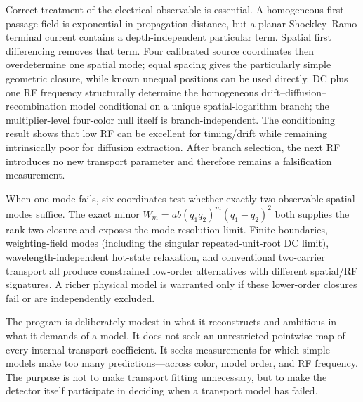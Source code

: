 \documentclass[11pt]{article}
\begin{document}
Correct treatment of the electrical observable is essential. A homogeneous first-passage field is exponential in propagation distance, but a planar Shockley--Ramo terminal current contains a depth-independent particular term. Spatial first differencing removes that term. Four calibrated source coordinates then overdetermine one spatial mode; equal spacing gives the particularly simple geometric closure, while known unequal positions can be used directly. DC plus one RF frequency structurally determine the homogeneous drift--diffusion--recombination model conditional on a unique spatial-logarithm branch; the multiplier-level four-color null itself is branch-independent. The conditioning result shows that low RF can be excellent for timing/drift while remaining intrinsically poor for diffusion extraction. After branch selection, the next RF introduces no new transport parameter and therefore remains a falsification measurement.

When one mode fails, six coordinates test whether exactly two observable spatial modes suffice. The exact minor $W_m=ab(q_1q_2)^m(q_1-q_2)^2$ both supplies the rank-two closure and exposes the mode-resolution limit. Finite boundaries, weighting-field modes (including the singular repeated-unit-root DC limit), wavelength-independent hot-state relaxation, and conventional two-carrier transport all produce constrained low-order alternatives with different spatial/RF signatures. A richer physical model is warranted only if these lower-order closures fail or are independently excluded.

The program is deliberately modest in what it reconstructs and ambitious in what it demands of a model. It does not seek an unrestricted pointwise map of every internal transport coefficient. It seeks measurements for which simple models make too many predictions---across color, model order, and RF frequency. The purpose is not to make transport fitting unnecessary, but to make the detector itself participate in deciding when a transport model has failed.
\end{document}
